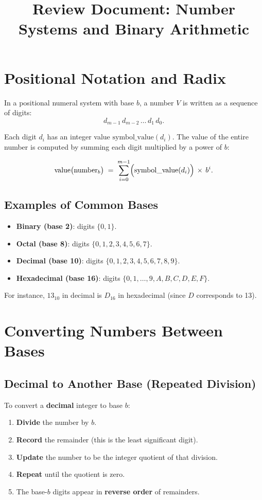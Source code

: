 \documentclass[12pt]{article}
\begin{document}
\title{\textbf{Review Document: Number Systems and Binary Arithmetic}}
\author{}
\date{}
\maketitle

\section{Positional Notation and Radix}

In a positional numeral system with base \(b\), a number \(V\) is written as a sequence of digits:
\[
  d_{m-1} \, d_{m-2} \,\dots\, d_{1} \, d_{0}.
\]

Each digit \(d_i\) has an integer value \(\mathrm{symbol\_value}(d_i)\). The value of the entire number is computed by summing each digit multiplied by a power of \(b\):

$$
  \mathrm{value}\bigl(\text{number}_{b}\bigr)
  \;=\;
  \sum_{i=0}^{m-1} \Bigl(\mathrm{symbol\_value}(d_i)\Bigr)\,\times\,b^i.
$$

\subsection{Examples of Common Bases}
\begin{itemize}
  \item \textbf{Binary (base 2)}: digits \(\{0, 1\}\).
  \item \textbf{Octal (base 8)}: digits \(\{0, 1, 2, 3, 4, 5, 6, 7\}\).
  \item \textbf{Decimal (base 10)}: digits \(\{0, 1, 2, 3, 4, 5, 6, 7, 8, 9\}\).
  \item \textbf{Hexadecimal (base 16)}: digits \(\{0, 1, \dots, 9, A, B, C, D, E, F\}\).
\end{itemize}

For instance, \(13_{10}\) in decimal is \(D_{16}\) in hexadecimal (since \(D\) corresponds to 13).

\section{Converting Numbers Between Bases}

\subsection{Decimal to Another Base (Repeated Division)}

To convert a \textbf{decimal} integer to base \(b\):
\begin{enumerate}
  \item \textbf{Divide} the number by \(b\).
  \item \textbf{Record} the remainder (this is the least significant digit).
  \item \textbf{Update} the number to be the integer quotient of that division.
  \item \textbf{Repeat} until the quotient is zero.
  \item The base-\(b\) digits appear in \textbf{reverse order} of remainders.
\end{enumerate}
\end{document}
